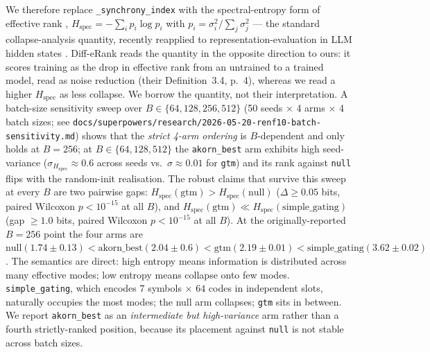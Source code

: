 \documentclass[10pt,twocolumn]{article}
\begin{document}
We therefore replace \texttt{\_synchrony\_index} with the spectral-entropy
form of effective rank \cite{royvetterli2007erank}, $H_{\text{spec}} =
-\sum_i p_i \log p_i$ with $p_i = \sigma_i^2 / \sum_j \sigma_j^2$ ---
the standard collapse-analysis quantity, recently reapplied to
representation-evaluation in LLM hidden states \cite{wei2024differank}.
Diff-eRank reads the quantity in the opposite direction to ours: it
scores training as the drop in effective rank from an untrained to a
trained model, read as noise reduction (their Definition~3.4, p.~4),
whereas we read a higher $H_{\text{spec}}$ as less collapse. We borrow
the quantity, not their interpretation.
A batch-size sensitivity sweep over $B \in \{64, 128, 256, 512\}$
(50 seeds $\times$ 4 arms $\times$ 4 batch sizes; see
\texttt{docs/superpowers/research/2026-05-20-renf10-batch-sensitivity.md})
shows that the \emph{strict 4-arm ordering} is $B$-dependent and only
holds at $B = 256$; at $B \in \{64, 128, 512\}$ the
\texttt{akorn\_best} arm exhibits high seed-variance
($\sigma_{H_{\text{spec}}} \approx 0.6$ across seeds vs.\
$\sigma \approx 0.01$ for \texttt{gtm}) and its rank against
\texttt{null} flips with the random-init realisation. The robust
claims that survive this sweep at every $B$ are two pairwise
gaps: $H_{\text{spec}}(\text{gtm}) > H_{\text{spec}}(\text{null})$
($\Delta \geq 0.05$ bits, paired Wilcoxon $p < 10^{-15}$ at all $B$),
and $H_{\text{spec}}(\text{gtm}) \ll H_{\text{spec}}(\text{simple\_gating})$
(gap $\geq 1.0$ bits, paired Wilcoxon $p < 10^{-15}$ at all $B$).
At the originally-reported $B = 256$ point the four arms are
$\text{null} (1.74 \pm 0.13) <
 \text{akorn\_best} (2.04 \pm 0.6) <
 \text{gtm} (2.19 \pm 0.01) <
 \text{simple\_gating} (3.62 \pm 0.02)$.
The semantics are direct: high entropy means information is distributed
across many effective modes; low entropy means collapse onto few modes.
\texttt{simple\_gating}, which encodes $7$ symbols $\times$ $64$ codes in
independent slots, naturally occupies the most modes; the null arm
collapses; \texttt{gtm} sits in between. We report \texttt{akorn\_best}
as an \emph{intermediate but high-variance} arm rather than a fourth
strictly-ranked position, because its placement against \texttt{null}
is not stable across batch sizes.
\end{document}
